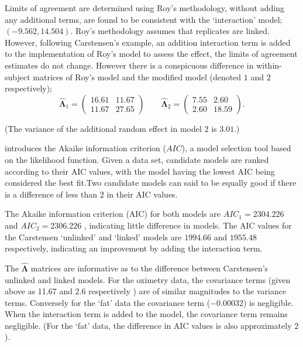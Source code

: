 \documentclass[12pt, a4paper]{report}
\theoremstyle{plain}
\theoremstyle{definition}
\theoremstyle{remark}
\begin{document}
	Limits of agreement are determined using Roy's methodology, without adding any additional terms, are found to be consistent with the `interaction' model; $(-9.562, 14.504 )$. Roy's methodology assumes that replicates are linked. However, following Carstensen's example, an addition interaction term is added to the implementation of Roy's model to assess the effect, the limits of agreement estimates do not change. However there is a conspicuous difference in within-subject matrices of Roy's model and the modified model (denoted $1$ and $2$ respectively);
	\begin{equation}
	\hat{\boldsymbol{\Lambda}}_{1}= \left(\begin{array}{cc}
	16.61 &	11.67\\
	11.67 & 27.65 \end{array}\right) \qquad
	\boldsymbol{\hat{\Lambda}}_{2}= \left( \begin{array}{cc}
	7.55 & 2.60 \\
	2.60 & 18.59 \end{array} \right). 
	\end{equation}
	
	\noindent (The variance of the additional random effect in model $2$ is $3.01$.)
	
	\citet{akaike} introduces the Akaike information criterion ($AIC$), a model 
	selection tool based on the likelihood function. Given a data set, candidate models
	are ranked according to their AIC values, with the model having the lowest AIC being considered the best fit.Two candidate models can said to be equally good if there is a difference of less than $2$ in their AIC values.
	
	The Akaike information criterion (AIC) for both models are $AIC_{1} = 2304.226$ and $AIC_{2} = 2306.226$ , indicating little difference in models. The AIC values for the Carstensen `unlinked' and `linked' models are $1994.66$ and $1955.48$ respectively, indicating an improvement by adding the interaction term.
	
	The $\boldsymbol{\hat{\Lambda}}$ matrices are informative as to the difference between Carstensen's unlinked and linked models. For the oximetry data, the covariance terms (given above as 11.67 and 2.6 respectively ) are of similar magnitudes to the variance terms. Conversely for the `fat' data the covariance term ($-0.00032$) is negligible. When the interaction term is added to the model, the covariance term remains negligible. (For the `fat' data, the difference in AIC values is also approximately $2$).
	
\end{document}
